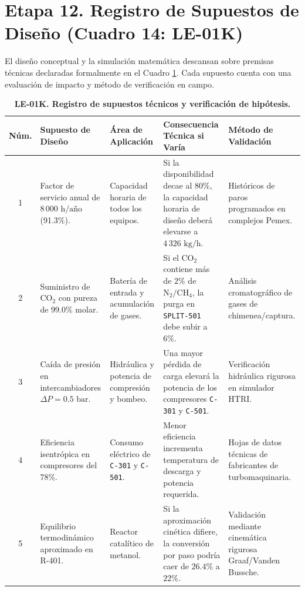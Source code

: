 \documentclass[10pt,letterpaper]{article}
\begin{document}
\section{Etapa 12. Registro de Supuestos de Diseño (Cuadro 14: LE-01K)}

El diseño conceptual y la simulación matemática descansan sobre premisas técnicas declaradas formalmente en el Cuadro \ref{tab:cuadro14}. Cada supuesto cuenta con una evaluación de impacto y método de verificación en campo.

\begin{table}[H]
\centering
\small
\setlength{\tabcolsep}{3.5pt}
\caption{\textbf{LE-01K. Registro de supuestos técnicos y verificación de hipótesis.}} \label{tab:cuadro14}
\begin{tabularx}{\textwidth}{c >{\raggedright\arraybackslash}p{2.6cm} >{\raggedright\arraybackslash}p{2.2cm} >{\raggedright\arraybackslash}X >{\raggedright\arraybackslash}p{3.2cm}}
\toprule
\textbf{Núm.} & \textbf{Supuesto de Diseño} & \textbf{Área de Aplicación} & \textbf{Consecuencia Técnica si Varía} & \textbf{Método de Validación} \\
\midrule
1 & Factor de servicio anual de $8\,000\text{ h/año}$ (91.3\%). & Capacidad horaria de todos los equipos. & Si la disponibilidad decae al $80\%$, la capacidad horaria de diseño deberá elevarse a $4\,326\text{ kg/h}$. & Históricos de paros programados en complejos Pemex. \\
2 & Suministro de $\text{CO}_2$ con pureza de $99.0\%$ molar. & Batería de entrada y acumulación de gases. & Si el $\text{CO}_2$ contiene más de $2\%$ de $\text{N}_2/\text{CH}_4$, la purga en \texttt{SPLIT-501} debe subir a $6\%$. & Análisis cromatográfico de gases de chimenea/captura. \\
3 & Caída de presión en intercambiadores $\Delta P = 0.5\text{ bar}$. & Hidráulica y potencia de compresión y bombeo. & Una mayor pérdida de carga elevará la potencia de los compresores \texttt{C-301} y \texttt{C-501}. & Verificación hidráulica rigurosa en simulador HTRI. \\
4 & Eficiencia isentrópica en compresores del $78\%$. & Consumo eléctrico de \texttt{C-301} y \texttt{C-501}. & Menor eficiencia incrementa temperatura de descarga y potencia requerida. & Hojas de datos técnicas de fabricantes de turbomaquinaria. \\
5 & Equilibrio termodinámico aproximado en R-401. & Reactor catalítico de metanol. & Si la aproximación cinética difiere, la conversión por paso podría caer de $26.4\%$ a $22\%$. & Validación mediante cinemática rigurosa Graaf/Vanden Bussche. \\

\end{tabularx}
\end{table}
\end{document}
